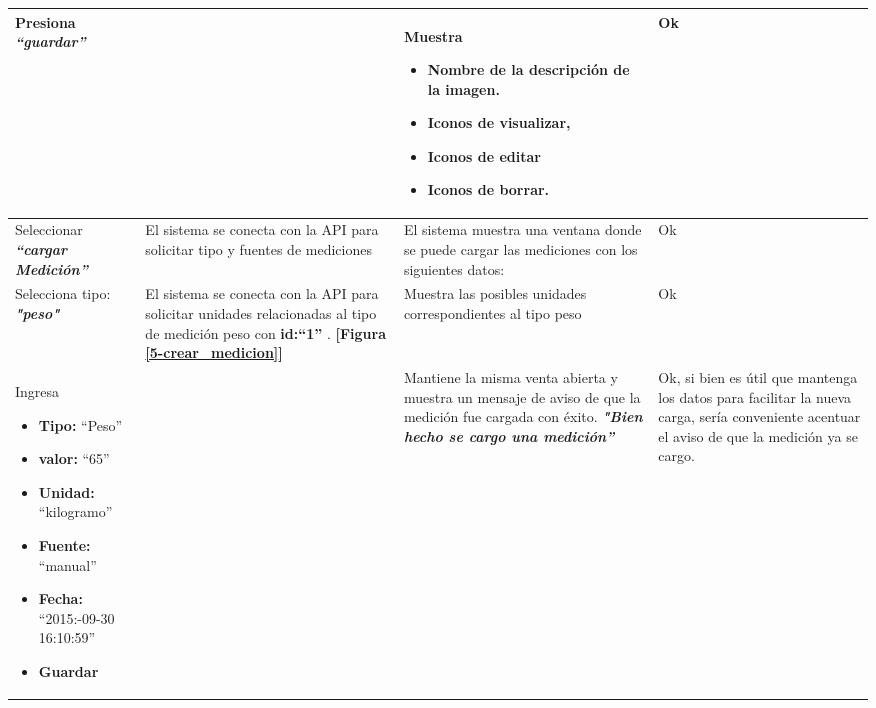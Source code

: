 {\begin{longtable}{|m{3.5cm}|m{3.5cm}|m{3.5cm}|m{2.5cm}|}
  			
  			
  			Presiona \textbf{\textit{``guardar''}}
  			&
  			& Muestra
  			\begin{itemize}
  				\item Nombre de la descripción de la imagen.
  				\item Iconos de visualizar,
  				\item \textbf{Iconos de editar}
  				\item \textbf{Iconos de borrar.}
  			\end{itemize}
  			& Ok
  			\\ \hline
  			
  			
  			
  			
  			
  			Seleccionar \textit{\textbf{``cargar Medición'' }}
  			& El sistema se conecta con la API para solicitar tipo y fuentes de mediciones
  			& El sistema muestra una ventana donde  se puede cargar las mediciones con los siguientes datos:
  			\textbf{\begin{itemize}
  					\item ``Tipo'',
  					\item ``Valor''
  					\item ``Unidad''
  					\item ``Fuente''
  					\item ``Fecha''
  				\end{itemize}}
  				\textbf{[Figura \ref{5-cargar_medicion}]}
  				& Ok
  				\\ \hline
  				
  				
  				
  				
  				Selecciona tipo:\textit{\textbf{ "peso"} }
  				& El sistema se conecta con la API para
  				solicitar unidades relacionadas al tipo de medición peso con \textbf{id:``1'' }. \textbf{[Figura \ref{5-crear_medicion}]}
  				& Muestra las posibles unidades correspondientes al tipo peso
  				& Ok
  				\\ \hline
  				
  				
  				
  				Ingresa
  				\begin{itemize}
  					\item \textbf{Tipo:} ``Peso''
  					\item \textbf{valor: }``65''
  					\item \textbf{Unidad:} ``kilogramo''
  					\item \textbf{Fuente: }``manual''
  					\item \textbf{Fecha: }``2015:-09-30 16:10:59''
  					\item \textbf{ Guardar}
  				\end{itemize}
  				&
  				& Mantiene la misma venta abierta y muestra un mensaje de aviso de que la
  				medición fue cargada con éxito.\textit{ \textbf{"Bien hecho se cargo una medición''}}
  				& Ok, si bien es útil que mantenga los datos para facilitar la nueva carga, sería conveniente acentuar el aviso de que la medición ya se cargo.
  				\\ \hline
  				

\end{longtable}}
